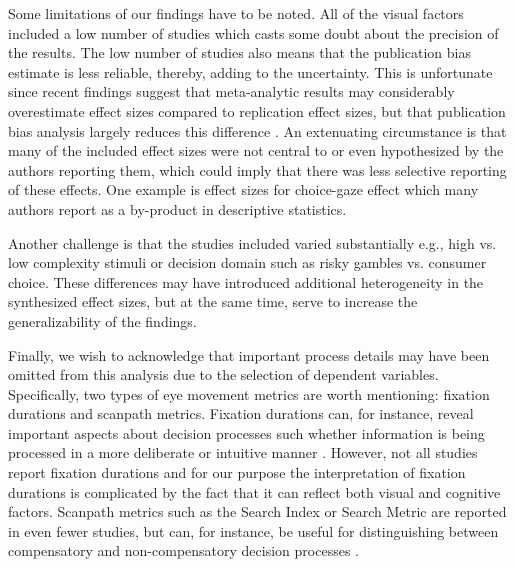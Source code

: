 Some limitations of our findings have to be noted. All of the visual factors included a low number of studies which casts some doubt about the precision of the results. The low number of studies also means that the publication bias estimate is less reliable, thereby, adding to the uncertainty. This is unfortunate since recent findings suggest that meta-analytic results may considerably overestimate effect sizes compared to replication effect sizes, but that publication bias analysis largely reduces this difference \citep{kvarven2020}. An extenuating circumstance is that many of the included effect sizes were not central to or even hypothesized by the authors reporting them, which could imply that there was less selective reporting of these effects. One example is effect sizes for choice-gaze effect which many authors report as a by-product in descriptive statistics. 

Another challenge is that the studies included varied substantially e.g., high vs. low complexity stimuli or decision domain such as risky gambles vs. consumer choice. These differences may have introduced additional heterogeneity in the synthesized effect sizes, but at the same time, serve to increase the generalizability of the findings. 

Finally, we wish to acknowledge that important process details may have been omitted from this analysis due to the selection of dependent variables. Specifically, two types of eye movement metrics are worth mentioning: fixation durations and scanpath metrics. Fixation durations can, for instance, reveal important aspects about decision processes such whether information is being processed in a more deliberate or intuitive manner \citep{horstmann2009}. However, not all studies report fixation durations and for our purpose the interpretation of fixation durations is complicated by the fact that it can reflect both visual and cognitive factors. Scanpath metrics such as the Search Index or Search Metric \citep{payne1976} are reported in even fewer studies, but can, for instance, be useful for distinguishing between compensatory and non-compensatory decision processes \citep{perkovic2018, schoemann2019}. \\ 



